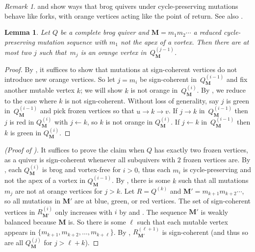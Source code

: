 \documentclass[12pt]{amsart}
\newtheorem{lem}[thm]{Lemma}
\theoremstyle{definition}
\theoremstyle{remark}
\newtheorem{rem}[thm]{Remark}
\numberwithin{equation}{section}
\begin{document}
\begin{rem}
 and  show ways that brog quivers under cycle-preserving mutations behave like forks, with orange vertices acting like the point of return. See also .
\end{rem}

\begin{lem}
\label{lem: orange is rare}
Let $Q$ be a complete brog quiver and $\mathbf M=m_1m_2\cdots$ a reduced cycle-preserving mutation sequence with $m_1$ not the apex of a vortex.
Then there are at most two $j$ such that~$m_j$ is an orange vertex in~$Q_{\mathbf M}^{(j-1)}$.
\end{lem} %

\begin{proof}
By , it suffices to show that mutations at sign-coherent vertices do not introduce new orange vertices.
So let $j=m_i$ be sign-coherent in~$Q_{\mathbf M}^{(i-1)}$ and fix another mutable vertex $k$; we will show $k$ is not orange in~$Q_{\mathbf M}^{(i)}$. 
By , we reduce to the case where $k$ is not sign-coherent.
Without loss of generality, say $j$ is green in~$Q_{\mathbf M}^{(i-1)}$ and pick frozen vertices so that $u \rightarrow k \rightarrow v$.
If $j \rightarrow k$ in~$Q_{\mathbf M}^{(i-1)}$ then $j$ is red in $Q_{\mathbf M}^{(i)}$ with $j \leftarrow k$, so $k$ is not orange in $Q_{\mathbf M}^{(i)}$. %
If $j \leftarrow k$ in~$Q_{\mathbf M}^{(i-1)}$ then $k$ is green in $Q_{\mathbf M}^{(i)}$.
\end{proof}

\begin{proof}[{(Proof of )}]
It suffices to prove the claim when $Q$ has exactly two frozen vertices, as a quiver is sign-coherent whenever all subquivers with $2$ frozen vertices are. 
By , each $Q_{\mathbf M}^{(i)}$ is brog and vortex-free for $i >0$, thus each $m_i$ is cycle-preserving and not the apex of a vortex in $Q_{\mathbf M}^{(i-1)}$.
By , there is some $k$ such that all mutations $m_j$ are not at orange vertices for $j > k$. Let $R = Q^{(k)}$ and $\mathbf M' = m_{k+1} m_{k+2} \cdots$, so all mutations in $\mathbf M'$ are at blue, green, or red vertices.
The set of sign-coherent vertices in $R_{\mathbf M'}^{(i)}$ only increases with $i$ by  and .
The sequence $\mathbf M'$ is weakly balanced because $\mathbf M$ is. 
So there is some $\ell$ such that each mutable vertex appears in $\{m_{k+1},m_{k+2},\ldots ,m_{k+\ell}\}$. 
By , $R_{\mathbf M'}^{(\ell+1)}$ is sign-coherent (and thus so are all $Q_{\mathbf M}^{(j)}$ for $j > \ell+k$).
\end{proof}
\end{document}

